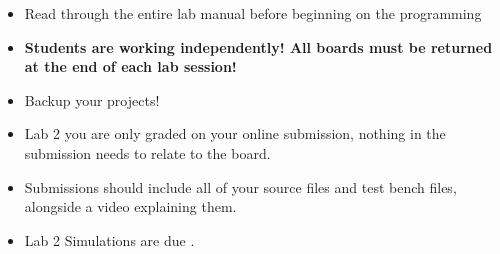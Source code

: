 \begin{itemize}
    \item Read through the entire lab manual before beginning on the programming
    \item \textbf{Students are working independently! All boards must be returned at the end of each lab session!}
    \item Backup your projects!
    \item Lab 2 you are only graded on your online submission, nothing in the submission needs to relate to the board.
    \item Submissions should include all of your source files and test bench files, alongside a video explaining them. 
    \item Lab 2 Simulations are due \labTwoSimsDue{}.
    
\end{itemize}